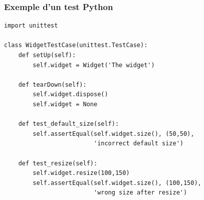 \documentclass[9pt]{beamer}
\begin{document}
\subsubsection{Exemple d'un test Python}
\begin{frame}[fragile]{\subsubsecname} %

\begin{verbatim}
import unittest

class WidgetTestCase(unittest.TestCase):
    def setUp(self):
        self.widget = Widget('The widget')

    def tearDown(self):
        self.widget.dispose()
        self.widget = None

    def test_default_size(self):
        self.assertEqual(self.widget.size(), (50,50),
                         'incorrect default size')

    def test_resize(self):
        self.widget.resize(100,150)
        self.assertEqual(self.widget.size(), (100,150),
                         'wrong size after resize')

\end{verbatim}
\end{frame}
\end{document}
